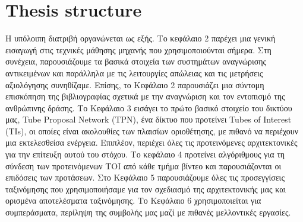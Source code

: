 \section{Thesis structure}
Η υπόλοιπη διατριβή οργανώνεται ως εξής. Το κεφάλαιο 2 παρέχει μια γενική εισαγωγή στις τεχνικές μάθησης μηχανής που χρησιμοποιούνται σήμερα.
Στη συνέχεια, παρουσιάζουμε τα βασικά στοιχεία των συστημάτων αναγνώρισης αντικειμένων και παράλληλα με τις λειτουργίες απώλειας και τις μετρήσεις αξιολόγησης
συνηθίζαμε. Επίσης, το Κεφάλαιο 2 παρουσιάζει μια σύντομη επισκόπηση της βιβλιογραφίας σχετικά με την αναγνώριση και τον εντοπισμό της ανθρώπινης δράσης. Το Κεφάλαιο 3 εισάγει το πρώτο βασικό στοιχείο του δικτύου μας, Tube Proposal Network (TPN), ένα δίκτυο που προτείνει Tubes of Interest (TIs), οι οποίες είναι ακολουθίες των πλαισίων οριοθέτησης, με πιθανό να περιέχουν μια εκτελεσθείσα ενέργεια. Επιπλέον, περιέχει όλες τις προτεινόμενες αρχιτεκτονικές για την επίτευξη αυτού του στόχου.
Το κεφάλαιο 4 προτείνει αλγόριθμους για τη σύνδεση των προτεινόμενων TOI από κάθε τμήμα βίντεο και παρουσιάζονται οι επιδόσεις των προτάσεων.
Στο Κεφάλαιο 5 παρουσιάζουμε όλες τις προσεγγίσεις ταξινόμησης που χρησιμοποιήσαμε για τον σχεδιασμό της αρχιτεκτονικής μας και ορισμένα αποτελέσματα ταξινόμησης.
Το Κεφάλαιο 6 χρησιμοποιείται για συμπεράσματα, περίληψη της συμβολής μας μαζί με πιθανές μελλοντικές εργασίες.

